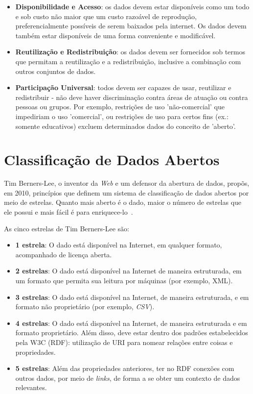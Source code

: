 \begin{itemize}
\item \textbf{Disponibilidade e Acesso}: os dados devem estar disponíveis como um todo e sob custo não maior que um custo razoável de reprodução, preferencialmente possíveis de serem baixados pela internet. Os dados devem também estar disponíveis de uma forma conveniente e modificável.

\item \textbf{Reutilização e Redistribuição}: os dados devem ser fornecidos sob termos que permitam a reutilização e a redistribuição, inclusive a combinação com outros conjuntos de dados.

\item \textbf{Participação Universal}: todos devem ser capazes de usar, reutilizar e redistribuir - não deve haver discriminação contra áreas de atuação ou contra pessoas ou grupos. Por exemplo, restrições de uso 'não-comercial' que impediriam o uso 'comercial', ou restrições de uso para certos fins (ex.: somente educativos) excluem determinados dados do conceito de 'aberto'.
\end{itemize}

\section{Classificação de Dados Abertos}
Tim Berners-Lee, o inventor da \emph{Web} e um defensor da abertura de dados, propõs, em 2010, princípios que definem um sistema de classificação de dados abertos por meio de estrelas. Quanto mais aberto é o dado, maior o número de estrelas que ele possui e mais fácil é para enriquece-lo~\cite{seijiconectados}.

As cinco estrelas de Tim Berners-Lee são:
\begin{itemize}
\item \textbf{1 estrela}: O dado está disponível na Internet, em qualquer formato, acompanhado de licença aberta.
\item \textbf{2 estrelas}: O dado está disponível na Internet de maneira estruturada, em um formato que permita sua leitura por máquinas (por exemplo, XML).
\item \textbf{3 estrelas}: O dado está disponível na Internet, de maneira estruturada, e em formato não proprietário (por exemplo, \emph{CSV}).
\item \textbf{4 estrelas}: O dado está disponível na Internet, de maneira estruturada e em formato proprietário. Além disso, deve estar dentro dos padrões estabelecidos pela W3C (RDF): utilização de URI para nomear relações entre coisas e propriedades.
\item \textbf{5 estrelas}: Além das propriedades anteriores, ter no RDF conexões com outros dados, por meio de \emph{links}, de forma a se obter um contexto de dados relevantes.
\end{itemize}

